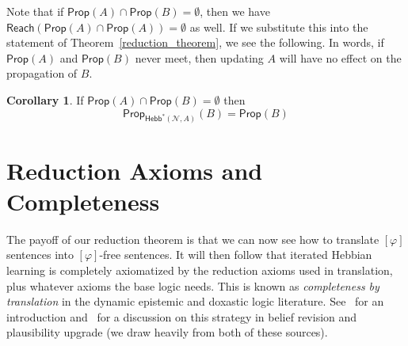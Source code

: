 \documentclass[letterpaper]{article}
\theoremstyle{definition}
\newtheorem{corollary}{Corollary}
\newcommand{\preds}[1]{\mbox{preds}(#1)}
\newcommand{\Net}{\mathcal{N}}
\newcommand{\Prop}{\mathsf{Prop}}
\newcommand{\Reach}{\mathsf{Reach}}
\newcommand{\Hebbstar}[2]{\mathsf{Hebb}^*(#1, #2)}
\newcommand{\Hebbop}[1]{[#1]}
\begin{document}


Note that if $\Prop(A) \cap \Prop(B) = \emptyset$, then we have $\Reach(\Prop(A) \cap \Prop(A)) = \emptyset$ as well.  If we substitute this into the statement of Theorem~\ref{reduction_theorem}, we see the following.  In words, if $\Prop(A)$ and $\Prop(B)$ never meet, then updating $A$ will have no effect on the propagation of $B$.

\begin{corollary} If $\Prop(A) \cap \Prop(B) = \emptyset$ then 
\[ \Prop_{\Hebbstar{\Net}{A}}(B) = \Prop(B) \]
\end{corollary}

\section{Reduction Axioms and Completeness}

The payoff of our reduction theorem is that we can now see how to translate $\Hebbop{\varphi}$ sentences into $\Hebbop{\varphi}$-free sentences.  It will then follow that iterated Hebbian learning is completely axiomatized by the reduction axioms used in translation, plus whatever axioms the base logic needs.  This is known as \emph{completeness by translation} in the dynamic epistemic and doxastic logic literature.  See~\cite{DELBook} for an introduction and~\cite{van2007beliefrevision} for a discussion on this strategy in belief revision and plausibility upgrade (we draw heavily from both of these sources).
\end{document}
